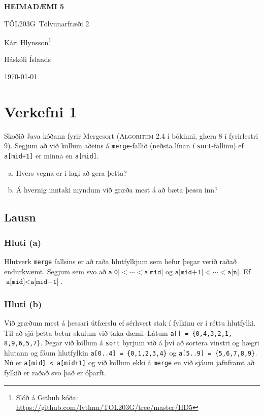 \documentclass[12pt, a4paper, hidelinks]{article}
\title{}
\newcommand{\doctitle}{\uppercase{Heimadæmi 5}}
\newcommand{\coursename}{Tölvunarfræði 2}
\newcommand{\coursenum}{TÖL203G}
\begin{document}
\thispagestyle{plain}
\centerline{\bfseries\Large\doctitle}
\medskip
\centerline{\large\coursenum\ \coursename}
\bigskip

\centerline{\large Kári Hlynsson\footnote{Slóð á Github kóða: \url{https://github.com/lvthnn/TOL203G/tree/master/HD5}}}
\bigskip
\centerline{Háskóli Íslands}
\medskip
\centerline{\today}


\section*{Verkefni 1}
Skoðið Java kóðann fyrir Mergesort (\textsc{Algorithm 2.4} í bókinni, glæra 8 í fyrirlestri 9).
Segjum að við köllum aðeins á \texttt{merge}-fallið (neðsta línan í \texttt{sort}-fallinu) ef
\texttt{a[mid+1]} er minna en \texttt{a[mid]}.
\begin{enumerate}[(a)]
    \item Hvers vegna er í lagi að gera þetta?
    \item Á hvernig inntaki myndum við græða mest á að bæta þessu inn?
\end{enumerate}

\subsection*{Lausn}
\subsubsection*{Hluti (a)}
Hlutverk \texttt{merge} fallsins er að raða hlutfylkjum sem hefur þegar verið raðað endurkvæmt.
Segjum sem svo að $\texttt{a[0]} < \cdots < \texttt{a[mid]}$ og $\texttt{a[mid+1]} < \cdots < \texttt{a[n]}$.
Ef $\texttt{a[mid]} < \texttt{a[mid+1]}$.

\subsubsection*{Hluti (b)}
Við græðum mest á þessari útfærslu ef sérhvert stak í fylkinu er í réttu hlutfylki. Til að sjá þetta betur
skulum við taka dæmi. Látum \texttt{a[] = \{0,4,3,2,1, 8,9,6,5,7\}}. Þegar við köllum á \texttt{sort} byrjum
við á því að sortera vinstri og hægri hlutann og fáum hlutfylkin \texttt{a[0..4] = \{0,1,2,3,4\}} og \texttt{a[5..9] = \{5,6,7,8,9\}}.
Nú er \texttt{a[mid] < a[mid+1]} og við köllum ekki á \texttt{merge} en við sjáum jafnframt að fylkið er raðað svo það er óþarft.

\newpage
\end{document}
